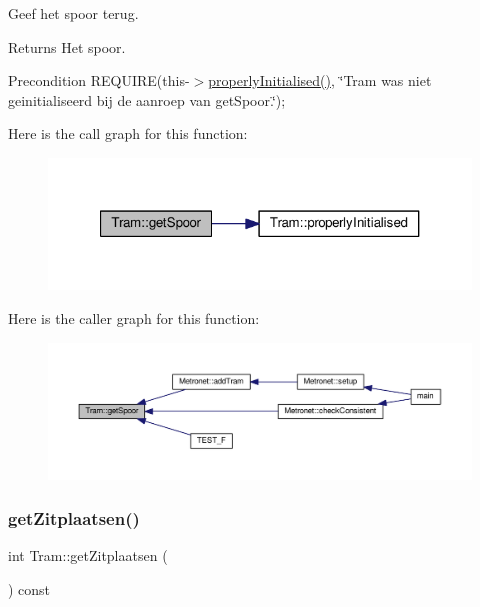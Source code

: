Geef het spoor terug. 

\begin{DoxyReturn}{Returns}
Het spoor. 
\end{DoxyReturn}
\begin{DoxyPrecond}{Precondition}
R\+E\+Q\+U\+I\+RE(this-\/$>$\hyperlink{class_tram_ac2688f590e4db232b4f535c9bf959efb}{properly\+Initialised()}, \char`\"{}\+Tram was niet geinitialiseerd bij de aanroep van get\+Spoor.\char`\"{}); 
\end{DoxyPrecond}
Here is the call graph for this function\+:\nopagebreak
\begin{figure}[H]
\begin{center}
\leavevmode
\includegraphics[width=321pt]{class_tram_a46c37aab218c334dac8b5340647f53ab_cgraph}
\end{center}
\end{figure}
Here is the caller graph for this function\+:\nopagebreak
\begin{figure}[H]
\begin{center}
\leavevmode
\includegraphics[width=350pt]{class_tram_a46c37aab218c334dac8b5340647f53ab_icgraph}
\end{center}
\end{figure}
\mbox{\label{class_tram_abcb1ce0d10e394fce8a99b460e5104de}} 
\subsubsection{\texorpdfstring{get\+Zitplaatsen()}{getZitplaatsen()}}
{\footnotesize\ttfamily int Tram\+::get\+Zitplaatsen (\begin{DoxyParamCaption}{ }\end{DoxyParamCaption}) const}



